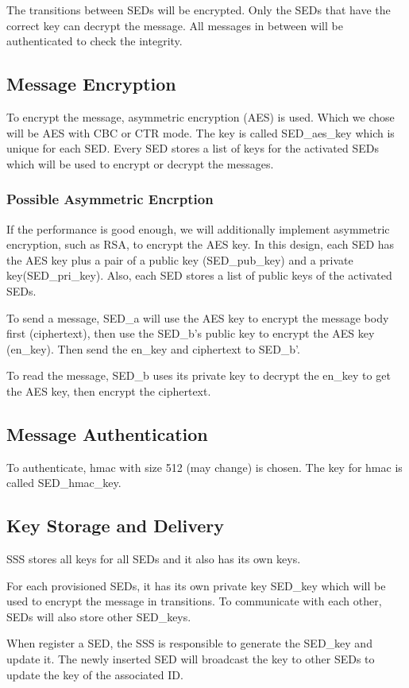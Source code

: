 \documentclass[11pt,oneside,onecolumn,letterpaper]{article}
\begin{document}
The transitions between SEDs will be encrypted.
Only the SEDs that have the correct key can decrypt the message.
All messages in between will be authenticated to check the integrity.

\subsection{Message Encryption}
To encrypt the message, asymmetric encryption (AES) is used.
Which we chose will be AES with CBC or CTR mode.
The key is called SED\_aes\_key which is unique for each SED.
Every SED stores a list of keys for the activated SEDs which will be used to encrypt or decrypt the messages.

\subsubsection{Possible Asymmetric Encrption}
If the performance is good enough, we will additionally implement asymmetric encryption, such as RSA, to encrypt the AES key.
In this design, each SED has the AES key plus a pair of a public key (SED\_pub\_key) and a private key(SED\_pri\_key).
Also, each SED stores a list of public keys of the activated SEDs.

To send a message, SED\_a will use the AES key to encrypt the message body first (ciphertext), then use the SED\_b's public key to encrypt the AES key (en\_key).
Then send the en\_key and ciphertext to SED\_b'.

To read the message, SED\_b uses its private key to decrypt the en\_key to get the AES key, then encrypt the ciphertext. 

\subsection{Message Authentication}
To authenticate, hmac with size 512 (may change) is chosen.
The key for hmac is called SED\_hmac\_key.

\subsection{Key Storage and Delivery}
SSS stores all keys for all SEDs and it also has its own keys.

For each provisioned SEDs, it has its own private key SED\_key which will be used to encrypt the message in transitions.
To communicate with each other, SEDs will also store other SED\_keys.

When register a SED, the SSS is responsible to generate the SED\_key and update it.
The newly inserted SED will broadcast the key to other SEDs to update the key of the associated ID.
\end{document}

